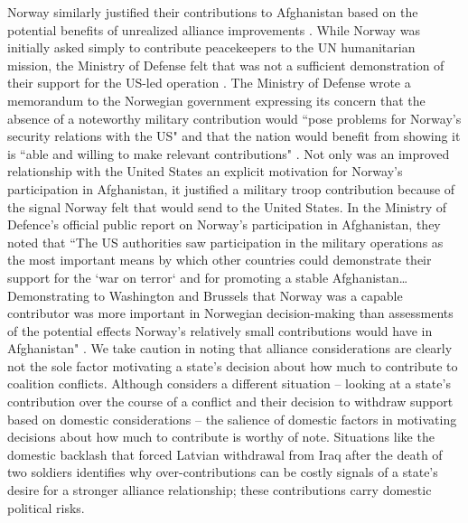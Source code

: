 \documentclass[12pt,letterpaper]{article}
\begin{document}
		Norway similarly justified their contributions to Afghanistan based on the potential benefits of unrealized alliance improvements \citep{oma_smallstatesburdensharing_2014}. While Norway was initially asked simply to contribute peacekeepers to the UN humanitarian mission, the Ministry of Defense felt that was not a sufficient demonstration of their support for the US-led operation \citep{ministryofdefenceiisecuritypolicy_mulignorskubatstotte_2001}. The Ministry of Defense wrote a memorandum to the Norwegian government expressing its concern that the absence of a noteworthy military contribution would ``pose problems for Norway's security relations with the US" and that the nation would benefit from showing it is ``able and willing to make relevant contributions" \citep{ministryofdefenceiisecuritypolicy_muligenorskemilitaere_2001}. Not only was an improved relationship with the United States an explicit motivation for Norway's participation in Afghanistan, it justified a military troop contribution because of the signal Norway felt that would send to the United States. In the Ministry of Defence's official public report on Norway's participation in Afghanistan, they noted that ``The US authorities saw participation in the military operations as the most important means by which other countries could demonstrate their support for the `war on terror` and for promoting a stable Afghanistan\ldots Demonstrating to Washington and Brussels that Norway was a capable contributor was more important in Norwegian decision-making than assessments of the potential effects Norway's relatively small contributions would have in Afghanistan" \citep[214-216]{godal_goodallynorway_2016}. We take caution in noting that alliance considerations are clearly not the sole factor motivating a state's decision about how much to contribute to coalition conflicts. Although \citet{mello_pathscoalitiondefection_2020} considers a different situation -- looking at a state's contribution over the course of a conflict and their decision to withdraw support based on domestic considerations -- the salience of domestic factors in motivating decisions about how much to contribute is worthy of note. Situations like the domestic backlash that forced Latvian withdrawal from Iraq after the death of two soldiers identifies why over-contributions can be costly signals of a state's desire for a stronger alliance relationship; these contributions carry domestic political risks.
\end{document}
